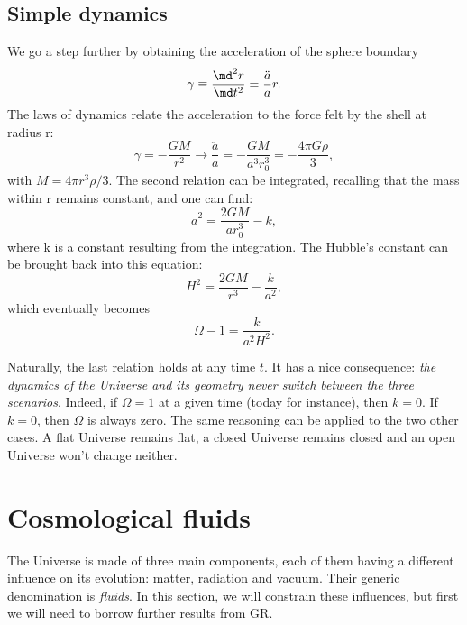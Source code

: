 \subsection{Simple dynamics} %
\label{sub:simple_dynamics}
We go a step further by obtaining the acceleration of the sphere boundary
\begin{equation}
	\gamma\equiv\frac{\md^2 r}{\md t^2}=\frac{\ddot a}{a}r.
\end{equation}
The laws of dynamics relate the acceleration to the force felt by the shell at radius r:
\begin{equation}
	\gamma=-\frac{GM}{r^2}\rightarrow \frac{\ddot a}{a}=-\frac{GM}{a^3 r_0^3}=-\frac{4\pi G\rho}{3},
	\label{eq:accel}
\end{equation}
with $M=4\pi r^3\rho/3$. The second relation can be integrated, recalling that the mass within r remains constant, and one can find:
\begin{equation}
	\dot a^2=\frac{2GM}{a r_0^3}-k,
\end{equation}
where k is a constant resulting from the integration. The Hubble's constant can be brought back into this equation:
\begin{equation}
	H^2=\frac{2GM}{r^3}-\frac{k}{a^2},
	\label{eq:friedmann}
\end{equation}
which eventually becomes
\begin{equation}
	\Omega-1=\frac{k}{a^2H^2}.
\end{equation}

Naturally, the last relation holds at any time $t$. It has a nice consequence: \emph{the dynamics of the Universe and its geometry never switch between the three scenarios}. Indeed, if $\Omega=1$ at a given time (today for instance), then $k=0$. If $k=0$, then $\Omega$ is always zero. The same reasoning can be applied to the two other cases. A flat Universe remains flat, a closed Universe remains closed and an open Universe won't change neither.
\section{Cosmological fluids} %
\label{sec:cosmological_fluids}
The Universe is made of three main components, each of them having a different influence on its evolution: matter, radiation and vacuum. Their generic denomination is \emph{fluids}. In this section, we will constrain these influences, but first we will need to borrow further results from GR.
